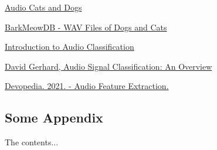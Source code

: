 \documentclass[12pt a4paper]{article}
\numberwithin{equation}{section}
\begin{document}
\begin{thebibliography}{2}
 \href{https://www.kaggle.com/mmoreaux/audio-cats-and-dogs}{Audio Cats and Dogs}

 \href{https://zenodo.org/record/3563990#.YZ99xtDMK3B}{BarkMeowDB - WAV Files of Dogs and Cats}

 \href{https://www.analyticsvidhya.com/blog/2021/06/introduction-to-audio-classification/}{Introduction to Audio Classification}

 \href{http://www2.cs.uregina.ca/~gerhard/publications/CAI00.pdf}{David Gerhard, Audio Signal Classification: An Overview}

 \href{https://devopedia.org/audio-feature-extraction}{Devopedia. 2021. - Audio Feature Extraction.}

\end{thebibliography}


\begin{appendices}
\chapter{Some Appendix}
The contents...
\end{appendices}  
\end{document}
